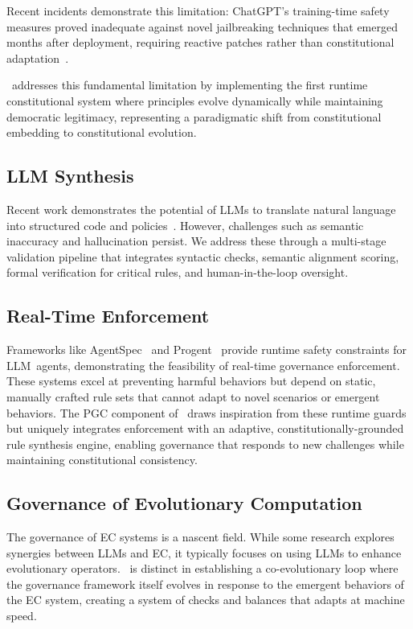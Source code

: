 Recent incidents demonstrate this limitation: ChatGPT's training-time safety measures proved inadequate against novel jailbreaking techniques that emerged months after deployment, requiring reactive patches rather than constitutional adaptation~\cite{wei2023jailbroken}.

\acgs{}\ addresses this fundamental limitation by implementing the first runtime constitutional system where principles evolve dynamically while maintaining democratic legitimacy, representing a paradigmatic shift from constitutional embedding to constitutional evolution.

\subsection{LLM Synthesis}
Recent work demonstrates the potential of LLMs to translate natural language into structured code and policies~\cite{propertygpt2023, veriplan2023}. However, challenges such as semantic inaccuracy and hallucination persist. We address these through a multi-stage validation pipeline that integrates syntactic checks, semantic alignment scoring, formal verification for critical rules, and human-in-the-loop oversight.

\subsection{Real-Time Enforcement}
Frameworks like AgentSpec~\cite{agentspec2023} and Progent~\cite{progent2023} provide runtime safety constraints for LLM~agents, demonstrating the feasibility of real-time governance enforcement. These systems excel at preventing harmful behaviors but depend on static, manually crafted rule sets that cannot adapt to novel scenarios or emergent behaviors. The PGC component of \acgs{}\ draws inspiration from these runtime guards but uniquely integrates enforcement with an adaptive, constitutionally-grounded rule synthesis engine, enabling governance that responds to new challenges while maintaining constitutional consistency.

\subsection{Governance of Evolutionary Computation}
The governance of EC systems is a nascent field. While some research explores synergies between LLMs and EC, it typically focuses on using LLMs to enhance evolutionary operators. \acgs{}\ is distinct in establishing a co-evolutionary loop where the governance framework itself evolves in response to the emergent behaviors of the EC system, creating a system of checks and balances that adapts at machine speed.
